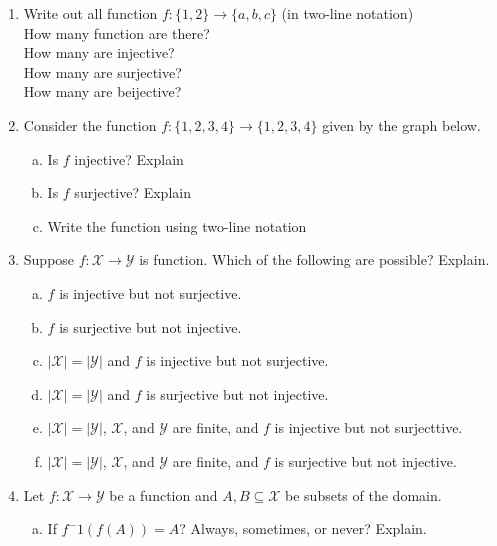 \documentclass[11pt, a4paper]{article}
\newcommand\setItemNumber[1]{\setcounter{enumi}{\numexpr#1-1\relax}}
\begin{document}
\begin{enumerate}
        \setItemNumber{6}
    \item Write out all function $f : \{1,2\}\rightarrow \{a,b,c\}$ (in two-line notation)\\
        How many function are there?\\
        How many are injective?\\
        How many are surjective?\\
        How many are beijective?\\

    \setItemNumber{8}
    \item Consider the function $f : \{1,2,3,4\}\rightarrow \{1,2,3,4\}$ given by the graph below.
        \begin{enumerate}[(a)]
            \item Is $f$ injective? Explain
            \item Is $f$ surjective? Explain
            \item Write the function using two-line notation
        \end{enumerate}


    \setItemNumber{19}
\item Suppose $f : \mathcal{X} \rightarrow \mathcal{Y}$ is function. Which of the following are possible? Explain.
        \begin{enumerate}[(a)]
            \item $f$ is injective but not surjective.
            \item $f$ is surjective but not injective.
            \item $|\mathcal{X}| = |\mathcal{Y}|$ and $f$ is injective but not surjective.
            \item $|\mathcal{X}| = |\mathcal{Y}|$ and $f$ is surjective but not injective.
            \item $|\mathcal{X}| = |\mathcal{Y}|$, $\mathcal{X}$, and $\mathcal{Y}$ are finite, and $f$ is injective but not surjecttive.             
            \item $|\mathcal{X}| = |\mathcal{Y}|$, $\mathcal{X}$, and $\mathcal{Y}$ are finite, and $f$ is surjective but not injective.
        \end{enumerate}

    \setItemNumber{28}
    \item Let $f: \mathcal{X}\rightarrow\mathcal{Y}$ be a function and $A,B\subseteq\mathcal{X}$ be subsets of the domain.
        \begin{enumerate}[(a)]
            \item If $f^-1(f(A)) = A$? Always, sometimes, or never? Explain.


\end{enumerate}
\end{enumerate}
\end{document}
